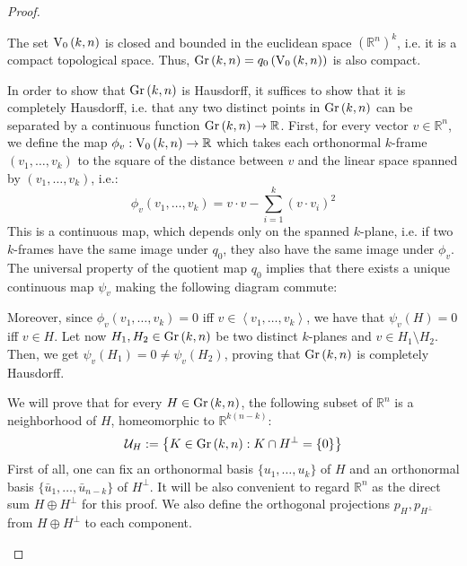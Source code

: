 \begin{proof} \begin{b_item}
\item The set $\StO{k}{n}$ is closed and bounded in the euclidean space $\left(\mathbb{R}^n\right)^k$, i.e. it is a compact topological space. Thus, $\Gr{k}{n}=q_0\left(\StO{k}{n}\right)$ is also compact.
\item In order to show that $\Gr{k}{n}$ is Hausdorff, it suffices to show that it is completely Hausdorff, i.e. that any two distinct points in $\Gr{k}{n}$ can be separated by a continuous function $\Gr{k}{n}\to\mathbb{R}$. First, for every vector $v\in\mathbb{R}^n$, we define the map $\phi_v:\StO{k}{n}\to\mathbb{R}$ which takes each orthonormal $k$-frame $(v_1,\ldots,v_k)$ to the square of the distance between $v$ and the linear space spanned by $(v_1,\ldots,v_k)$, i.e.:
$$\phi_v(v_1,\ldots,v_k)=v\cdot v-\sum_{i=1}^k\left(v\cdot v_i\right)^2$$
This is a continuous map, which depends only on the spanned $k$-plane, i.e. if two $k$-frames have the same image under $q_0$, they also have the same image under $\phi_v$. The universal property of the quotient map $q_0$ implies that there exists a unique continuous map $\psi_v$ making the following diagram commute:
\begin{center}
\end{center}
Moreover, since $\phi_v(v_1,\ldots,v_k)=0$ iff $v\in\left<v_1,\ldots,v_k\right>$, we have that $\psi_v(H)=0$ iff $v\in H$. Let now $H_1,H_2\in\Gr{k}{n}$ be two distinct $k$-planes and $v\in H_1\setminus H_2$. Then, we get $\psi_v(H_1)=0\neq\psi_v(H_2)$, proving that $\Gr{k}{n}$ is completely Hausdorff.


\item We will prove that for every $H\in\Gr{k}{n}$, the following subset of $\mathbb{R}^n$ is a neighborhood of $H$, homeomorphic to $\mathbb{R}^{k(n-k)}$:
$$\mathcal{U}_H:=\left\{K\in\Gr{k}{n}:K\cap H^{\perp}=\{0\}\right\}$$
First of all, one can fix an orthonormal basis $\{u_1,\ldots,u_k\}$ of $H$ and an orthonormal basis $\{\bar{u}_1,\ldots,\bar{u}_{n-k}\}$ of $H^{\perp}$. It will be also convenient to regard $\mathbb{R}^n$ as the direct sum $H\oplus H^{\perp}$ for this proof. We also define the orthogonal projections $p_H,p_{H^{\perp}}$ from $H\oplus H^{\perp}$ to each component.


\end{b_item}
\end{proof}
